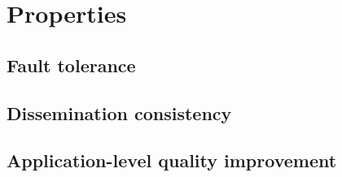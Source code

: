 \section{Properties}
\subsection{Fault tolerance}

\subsection{Dissemination consistency}
\subsection{Application-level quality improvement}
